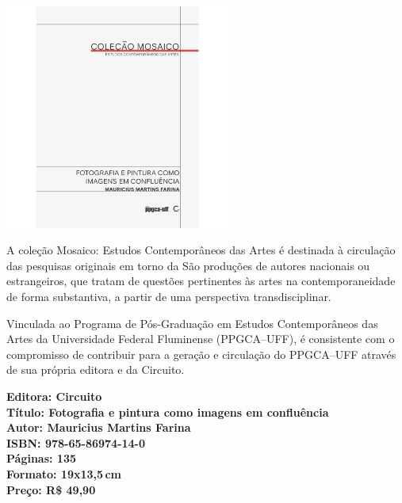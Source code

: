 \begin{center}
\hspace*{-3.6cm}
\hspace*{3.1cm}\includegraphics[width=74mm]{./CAPAS/CIRCUITO_FOTOGRAFIA.jpg}
\end{center}
\hspace*{-7cm}\hrulefill\hspace*{-7cm}
\medskip

\noindent{}A coleção Mosaico: Estudos Contemporâneos das Artes é destinada à circulação das pesquisas originais em torno da  São produções de autores nacionais ou estrangeiros, que tratam de questões pertinentes às artes na contemporaneidade de forma substantiva, a partir de uma perspectiva transdisciplinar. 

Vinculada ao Programa de Pós-Graduação em Estudos Contemporâneos das Artes da Universidade Federal Fluminense (PPGCA--UFF), é consistente com o compromisso de contribuir para a geração e circulação do PPGCA--UFF através de sua própria editora e da Circuito.

\vfill
\noindent\begin{minipage}[c]{1\linewidth}
{\small\textbf{
\hspace*{-.1cm}Editora: Circuito\\
Título: Fotografia e pintura como imagens em confluência\\
Autor: Mauricius Martins Farina\\ 
ISBN: 978-65-86974-14-0\\
Páginas: 135\\
Formato: 19x13,5\,cm\\
Preço: R\$ 49,90\\
}}
\end{minipage}
\pagebreak

